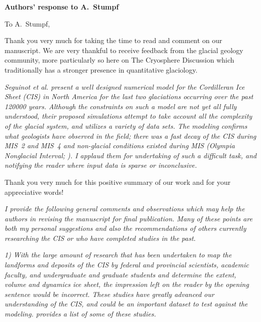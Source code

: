 


\textbf{Authors' response to A.~Stumpf}
\bigskip


\newcommand{\sechead}[1]{\bigskip\noindent\textbf{#1}}
\newcommand{\referee}[1]{\bigskip\textcolor{journalname}{\textit{#1}}}
\newcommand{\msquote}[1]{\begin{quote}\textit{#1}\end{quote}}

To A.~Stumpf,

Thank you very much for taking the time to read and comment on our manuscript.
We are very thankful to receive feedback from the glacial geology community,
more particularly so here on The Cryosphere Discussion which traditionally
has a stronger presence in quantitative glaciology.

\referee{%
    Seguinot et al. present a well designed numerical model for the Cordilleran
    Ice Sheet (CIS) in North America for the last two glaciations occurring
    over the past 120000 years. Although the constraints on such a model are
    not yet all fully understood, their proposed simulations attempt to take
    account all the complexity of the glacial system, and utilizes a variety of
    data sets. The modeling confirms what geologists have observed in the
    field; there was a fast decay of the CIS during MIS~2 and MIS~4 and
    non-glacial conditions existed during MIS (Olympia Nonglacial Interval;
    \citealp[e.g.,][]{Plouffe.Jette.1997}). I applaud them for undertaking of
    such a difficult task, and notifying the reader where input data is sparse
    or inconclusive.}

Thank you very much for this positive summary of our work and for your
appreciative words!

\referee{%
    I provide the following general comments and observations which may help
    the authors in revising the manuscript for final publication. Many of these
    points are both my personal suggestions and also the recommendations of
    others currently researching the CIS or who have completed studies in the
    past.}

\referee{%
    1) With the large amount of research that has been undertaken to map the
    landforms and deposits of the CIS by federal and provincial scientists,
    academic faculty, and undergraduate and graduate students and determine the
    extent, volume and dynamics ice sheet, the impression left on the reader by
    the opening sentence would be incorrect. These studies have greatly
    advanced our understanding of the CIS, and could be an important dataset to
    test against the modeling. \citet{Stumpf.etal.2014} provides a list of some
    of these studies.}

